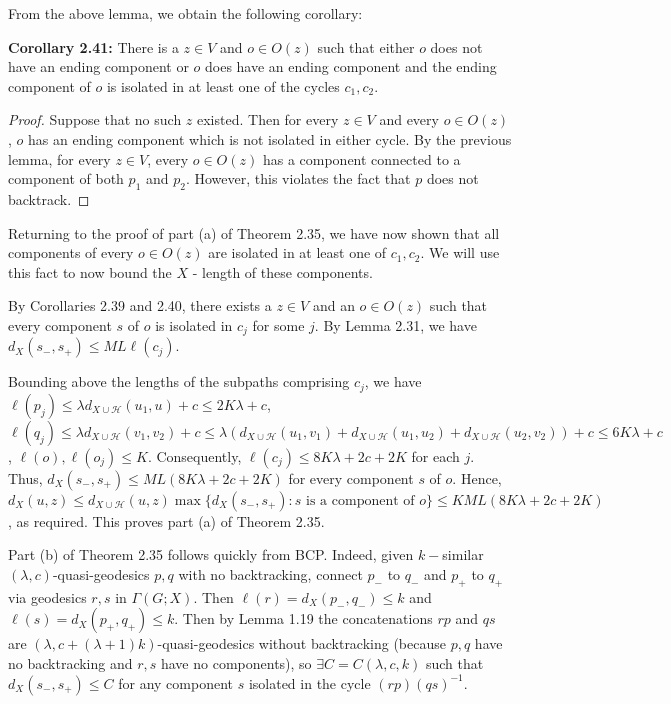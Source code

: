 \documentclass[12pt]{article}
\newcommand{\vs}{\vskip10pt}
\begin{document}
	From the above lemma, we obtain the following corollary: 
	
	\vs 
	
	\textbf{Corollary 2.41: } There is a $z \in V$ and $o \in O(z)$ such that either $o$ does not have an ending component or $o$ does have an ending component and the ending component of $o$ is isolated in at least one of the cycles $c_1,c_2$.
	
	\begin{proof}
		
		Suppose that no such $z$ existed. Then for every $z \in V$ and every $o \in O(z)$, $o$ has an ending component which is not isolated in either cycle. By the previous lemma, for every $z \in V$, every $o \in O(z)$ has a component connected to a component of both $p_1$ and $p_2$. However, this violates the fact that $p$ does not backtrack. 
		
	\end{proof}

	Returning to the proof of part (a) of Theorem 2.35, we have now shown that all components of every $o \in O(z)$ are isolated in at least one of $c_1, c_2$. We will use this fact to now bound the $X$ - length of these components. 
	
	\vs 
	
	By Corollaries 2.39 and 2.40, there exists a $z \in V$ and an $o \in O(z)$ such that every component $s$ of $o$ is isolated in $c_j$ for some $j$. By Lemma 2.31, we have $d_X(s_-, s_+) \leq ML \ell(c_j)$. 
	
	\vs 
	
	Bounding above the lengths of the subpaths comprising $c_j$, we have $\ell(p_j) \leq \lambda d_{X \cup \mathcal{H}}(u_1, u) + c \leq 2K\lambda + c$, $\ell(q_j) \leq \lambda d_{X \cup \mathcal{H}}(v_1, v_2) + c \leq \lambda (d_{X \cup \mathcal{H}}(u_1, v_1) + d_{X \cup \mathcal{H}}(u_1, u_2) + d_{X \cup \mathcal{H}}(u_2, v_2)) + c \leq 6 K \lambda + c$, $\ell(o), \ell(o_j) \leq K$. Consequently, $\ell(c_j) \leq 8K \lambda + 2c + 2K$ for each $j$.  Thus, $d_X(s_-, s_+) \leq ML(8K \lambda + 2c + 2K)$ for every component $s$ of $o$. Hence, $d_X(u,z) \leq d_{X \cup \mathcal{H}}(u,z) \max \{d_X(s_-, s_+): s \text{ is a component of } o\}\leq K ML(8K \lambda + 2c + 2K)$, as required. This proves part (a) of Theorem 2.35. 
	
	\vs
	
	Part (b) of Theorem 2.35 follows quickly from BCP. Indeed, given $k-$similar $(\lambda, c)$-quasi-geodesics $p,q$ with no backtracking, connect $p_-$ to $q_-$ and $p_+$ to $q_+$ via geodesics $r,s$ in $\Gamma(G;X)$. Then $\ell(r) = d_X(p_-, q_-) \leq k$ and $\ell(s) = d_X(p_+, q_+) \leq k$. Then by Lemma 1.19 the concatenations $rp$ and $qs$ are $(\lambda, c + (\lambda + 1)k)$-quasi-geodesics without backtracking (because $p,q$ have no backtracking and $r,s$ have no components), so $\exists C = C(\lambda, c, k)$ such that $d_X(s_-, s_+) \leq C$ for any component $s$ isolated in the cycle $(rp)(qs)^{-1}$. 
	
\end{document}
